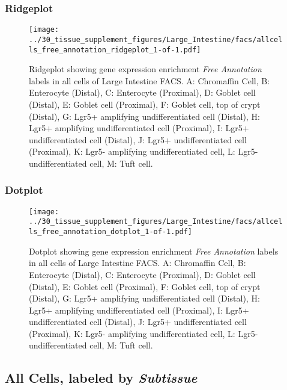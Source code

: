\clearpage

\subsubsection{Ridgeplot}
\begin{figure}[h]
\centering
\texttt{[image: ../30\_tissue\_supplement\_figures/Large\_Intestine/facs/allcells\_free\_annotation\_ridgeplot\_1-of-1.pdf]}

\caption{ Ridgeplot  showing gene expression enrichment \emph{Free Annotation} labels in all cells of Large Intestine FACS. A: Chromaffin Cell, B: Enterocyte (Distal), C: Enterocyte (Proximal), D: Goblet cell (Distal), E: Goblet cell (Proximal), F: Goblet cell, top of crypt (Distal), G: Lgr5+ amplifying undifferentiated cell (Distal), H: Lgr5+ amplifying undifferentiated cell (Proximal), I: Lgr5+ undifferentiated cell (Distal), J: Lgr5+ undifferentiated cell (Proximal), K: Lgr5- amplifying undifferentiated cell, L: Lgr5- undifferentiated cell, M: Tuft cell.}
\end{figure}


\clearpage

\subsubsection{Dotplot}
\begin{figure}[h]
\centering
\texttt{[image: ../30\_tissue\_supplement\_figures/Large\_Intestine/facs/allcells\_free\_annotation\_dotplot\_1-of-1.pdf]}

\caption{ Dotplot  showing gene expression enrichment \emph{Free Annotation} labels in all cells of Large Intestine FACS. A: Chromaffin Cell, B: Enterocyte (Distal), C: Enterocyte (Proximal), D: Goblet cell (Distal), E: Goblet cell (Proximal), F: Goblet cell, top of crypt (Distal), G: Lgr5+ amplifying undifferentiated cell (Distal), H: Lgr5+ amplifying undifferentiated cell (Proximal), I: Lgr5+ undifferentiated cell (Distal), J: Lgr5+ undifferentiated cell (Proximal), K: Lgr5- amplifying undifferentiated cell, L: Lgr5- undifferentiated cell, M: Tuft cell.}
\end{figure}


\clearpage

\subsection{All Cells, labeled by \emph{Subtissue}}
